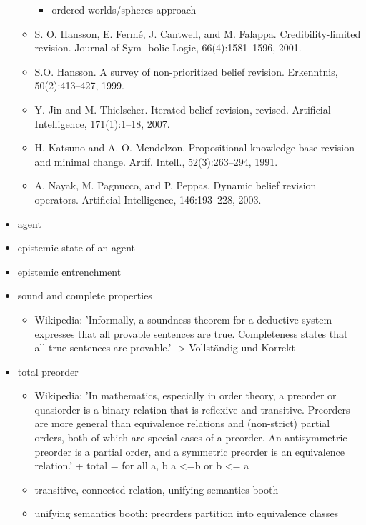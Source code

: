 \documentclass[11pt]{article}
\begin{document}
\begin{itemize}
\begin{itemize}
        \begin{itemize}
            \item ordered worlds/spheres approach
        \end{itemize}
        \item S. O. Hansson, E. Fermé, J. Cantwell, and M. Falappa. Credibility-limited revision. Journal of Sym- bolic Logic, 66(4):1581–1596, 2001.
        \item S.O. Hansson. A survey of non-prioritized belief revision. Erkenntnis, 50(2):413–427, 1999.
        \item Y. Jin and M. Thielscher. Iterated belief revision, revised. Artificial Intelligence, 171(1):1–18, 2007.
        \item H. Katsuno and A. O. Mendelzon. Propositional knowledge base revision and minimal change. Artif. Intell., 52(3):263–294, 1991.
        \item A. Nayak, M. Pagnucco, and P. Peppas. Dynamic belief revision operators. Artificial Intelligence,
146:193–228, 2003.
    \end{itemize}
    \item agent
    \item epistemic state of an agent
    \item epistemic entrenchment
    \item sound and complete properties
    \begin{itemize}
        \item Wikipedia: 'Informally, a soundness theorem for a deductive system expresses that all provable sentences are true. Completeness states that all true sentences are provable.' -> Vollständig und Korrekt
    \end{itemize}
    \item total preorder
    \begin{itemize}
        \item Wikipedia: 'In mathematics, especially in order theory, a preorder or quasiorder is a binary relation that is reflexive and transitive. Preorders are more general than equivalence relations and (non-strict) partial orders, both of which are special cases of a preorder. An antisymmetric preorder is a partial order, and a symmetric preorder is an equivalence relation.' + total = for all a, b a <=b or b <= a
        \item transitive, connected relation, unifying semantics booth
        \item unifying semantics booth: preorders partition into equivalence classes

\end{itemize}
\end{itemize}
\end{document}
